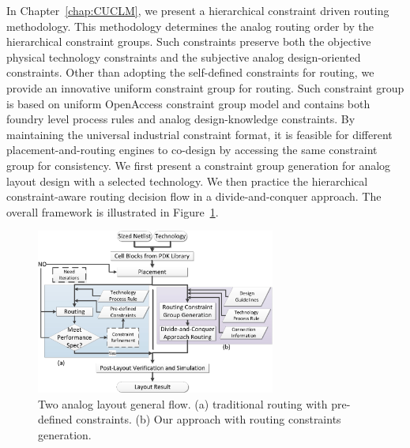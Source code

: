       In Chapter~\ref{chap:CUCLM}, we present a hierarchical constraint driven routing methodology. This methodology determines the analog routing order by the hierarchical constraint groups. Such constraints preserve both the objective physical technology constraints and the subjective  analog design-oriented constraints. Other than adopting the self-defined constraints for routing, we provide an innovative uniform constraint group for routing. Such constraint group is based on uniform OpenAccess constraint group model and contains both foundry level process rules and analog design-knowledge constraints. By maintaining the universal industrial constraint format, it is feasible for different placement-and-routing engines to co-design by accessing the same constraint group for consistency. We first present a constraint group generation for analog layout design with a selected technology. We then practice the hierarchical constraint-aware routing decision flow in a divide-and-conquer approach. The overall framework is illustrated in Figure~\ref{fig:LayoutFlow}.
    
      \begin{figure}[ht]
          \centerline{
            \includegraphics[width=0.7\textwidth]{Fig/Introduction/LayoutFlow.eps}
          }
          \caption{Two analog layout general flow. (a) traditional routing with pre-defined constraints. (b) Our approach with routing constraints generation. }
          \label{fig:LayoutFlow}
        \end{figure}

